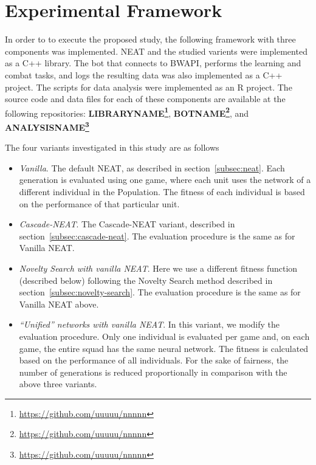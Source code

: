 \section{Experimental Framework}\label{section:proposal}

In order to to execute the proposed study, the following framework
with three components was implemented. NEAT and the studied varients
were implemented as a C++ library. The bot that connects to BWAPI,
performs the learning and combat tasks, and logs the resulting data
was also implemented as a C++ project. The scripts for data analysis
were implemented as an R project. The source code and data files for
each of these components are available at the following repositories:
{\bf LIBRARYNAME\footnote{\url{https://github.com/uuuuu/nnnnn}}}, {\bf
  BOTNAME\footnote{\url{https://github.com/uuuuu/nnnnn}}}, and {\bf
  ANALYSISNAME\footnote{\url{https://github.com/uuuuu/nnnnn}}}


The four variants investigated in this study are as follows
\begin{itemize}
    \item \emph{Vanilla}. The default NEAT, as described in
      section~\ref{subsec:neat}. Each generation is evaluated using one
      game, where each unit uses the network of a different individual
      in the Population. The fitness of each individual is based on
      the performance of that particular unit.
    \item \emph{Cascade-NEAT}. The Cascade-NEAT variant, described in
      section~\ref{subsec:cascade-neat}. The evaluation procedure is
      the same as for Vanilla NEAT.
    \item \emph{Novelty Search with vanilla NEAT}. Here we use a
      different fitness function (described below) following the
      Novelty Search method described in
      section~\ref{subsec:novelty-search}. The evaluation procedure is
      the same as for Vanilla NEAT above.
    \item \emph{``Unified'' networks with vanilla NEAT}. In this
      variant, we modify the evaluation procedure. Only one individual
      is evaluated per game and, on each game, the entire squad has
      the same neural network. The fitness is calculated based on the
      performance of all individuals. For the sake of fairness, the
      number of generations is reduced proportionally in comparison
      with the above three variants.
\end{itemize}


